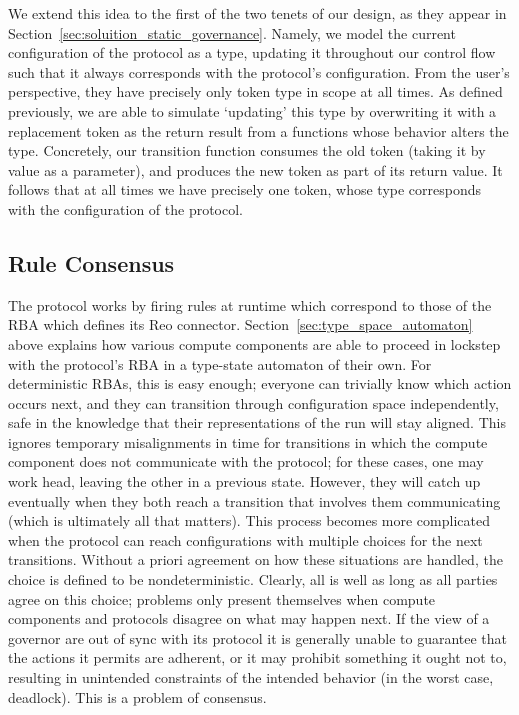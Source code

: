 We extend this idea to the first of the two tenets of our design, as they appear in Section~\ref{sec:soluition_static_governance}. Namely, we model the current configuration of the protocol as a type, updating it throughout our control flow such that it always corresponds with the protocol's configuration. From the user's perspective, they have precisely only token type in scope at all times. As defined previously, we are able to simulate `updating' this type by overwriting it with a replacement token as the return result from a functions whose behavior alters the type. Concretely, our transition function consumes the old token (taking it by value as a parameter), and produces the new token as part of its return value. It follows that at all times we have precisely one token, whose type corresponds with the configuration of the protocol.

\subsection{Rule Consensus}
\label{sec:rule_consensus}
The protocol works by firing rules at runtime which correspond to those of the RBA which defines its Reo connector. Section~\ref{sec:type_space_automaton} above explains how various compute components are able to proceed in lockstep with the protocol's RBA in a type-state automaton of their own. For deterministic RBAs, this is easy enough; everyone can trivially know which action occurs next, and they can transition through configuration space independently, safe in the knowledge that their representations of the run will stay aligned. This ignores temporary misalignments in time for transitions in which the compute component does not communicate with the protocol; for these cases, one may work head, leaving the other in a previous state. However, they will catch up eventually when they both reach a transition that involves them communicating (which is ultimately all that matters). This process becomes more complicated when the protocol can reach configurations with multiple choices for the next transitions. Without a priori agreement on how these situations are handled, the choice is defined to be nondeterministic. Clearly, all is well as long as all parties agree on this choice; problems only present themselves when compute components and protocols disagree on what may happen next. If the view of a governor are out of sync with its protocol it is generally unable to guarantee that the actions it permits are adherent, or it may prohibit something it ought not to, resulting in unintended constraints of the intended behavior (in the worst case, deadlock). This is a problem of consensus. 


